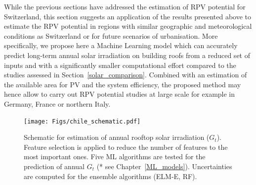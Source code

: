 \label{chile_method}

While the previous sections have addressed the estimation of RPV potential for Switzerland, this section suggests an application of the results presented above to estimate the RPV potential in regions with similar geographic and meteorological conditions as Switzerland or for future scenarios of urbanisation.
More specifically, we propose here a Machine Learning model which can accurately predict long-term annual solar irradiation on building roofs from a reduced set of inputs and with a significantly smaller computational effort compared to the studies assessed in Section~\ref{solar_comparison}. 
Combined with an estimation of the available area for PV and the system efficiency, the proposed method may hence allow to carry out RPV potential studies at large scale for example in Germany, France or northern Italy.


\begin{figure}[tb]
\centering\texttt{[image: Figs/chile\_schematic.pdf]}
\caption{Schematic for estimation of annual rooftop solar irradiation ($G_t$). Feature selection is applied to reduce the number of features to the most important ones. Five ML algorithms are tested for the prediction of annual $G_t$ (* see Chapter~\ref{ML_models}). Uncertainties are computed for the ensemble algorithms (ELM-E, RF). }
\label{fig:chile_schema}
\end{figure}

